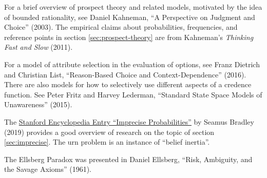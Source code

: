 \begin{sources}
  
  For a brief overview of prospect theory and related models, motivated by the
  idea of bounded rationality, see Daniel Kahneman, ``A Perspective on Judgment
  and Choice'' (2003). The empirical claims about probabilities, frequencies,
  and reference points in section \ref{sec:prospect-theory} are from Kahneman's
  \emph{Thinking Fast and Slow} (2011).

  For a model of attribute selection in the evaluation of options, see Franz
  Dietrich and Christian List, ``Reason-Based Choice and Context-Dependence''
  (2016).
  There are also models for how to selectively use different aspects of a
  credence function. See Peter Fritz and Harvey Lederman, ``Standard State Space
  Models of Unawareness'' (2015).

  
  The
  \href{https://plato.stanford.edu/entries/imprecise-probabilities/}{Stanford Encyclopedia Entry ``Imprecise Probabilities''}
  by Seamus Bradley (2019) provides a good overview of research on the topic of
  section \ref{sec:imprecise}. The urn problem is an instance of ``belief
  inertia''.

  The Ellsberg Paradox was presented in Daniel Ellsberg, ``Risk, Ambiguity, and
  the Savage Axioms'' (1961).

\end{sources}




